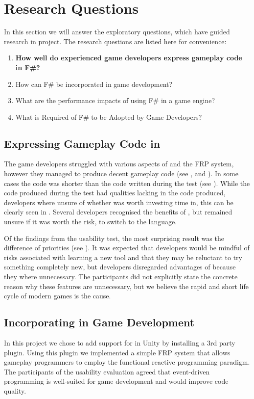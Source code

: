 \section{Research Questions}
In this section we will answer the exploratory questions, which have guided research in project. The research questions are listed here for convenience:
\begin{center}
    \begin{enumerate}
        \item \textbf{How well do experienced game developers express gameplay code in F\#?}
        \item How can F\# be incorporated in game development?
        \item What are the performance impacts of using F\# in a game engine?
        \item What is Required of F\# to be Adopted by Game Developers?
    \end{enumerate}
\end{center}

\subsection{Expressing Gameplay Code in \fs}
The game developers struggled with various aspects of \fs and the \gls{FRP} system, however they managed to produce decent gameplay code (see ,  and ). In some cases the \fs code was shorter than the \cs code written during the test (see ). While the \fs code produced during the test had qualities lacking in the \cs code produced, developers where unsure of whether \fs was worth investing time in, this can be clearly seen in . Several developers recognised the benefits of \fs, but remained unsure if it was worth the risk, to switch to the language.

Of the findings from the usability test, the most surprising result was the difference of priorities (see ). It was expected that developers would be mindful of risks associated with learning a new tool and that they may be reluctant to try something completely new, but developers disregarded advantages of \fs because they where unnecessary. The participants did not explicitly state the concrete reason why these features are unnecessary, but we believe the rapid and short life cycle of modern games is the cause.

\subsection{Incorporating \fs in Game Development}
In this project we chose to add support for \fs in Unity by installing a 3rd party plugin. Using this plugin we implemented a simple \gls{FRP} system that allows gameplay programmers to employ the functional reactive programming paradigm. The participants of the usability evaluation agreed that event-driven programming is well-suited for game development and would improve code quality.

